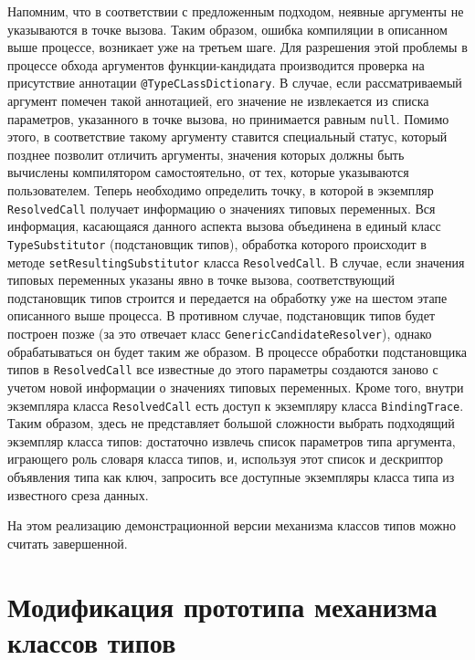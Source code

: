 Напомним, что в соответствии с предложенным подходом, неявные аргументы не указываются в точке вызова. Таким образом, ошибка компиляции в описанном выше процессе, возникает уже на третьем шаге. Для разрешения этой проблемы в процессе обхода аргументов функции-кандидата производится проверка на присутствие аннотации \lstinline{@TypeCLassDictionary}. В случае, если рассматриваемый аргумент помечен такой аннотацией, его значение не извлекается из списка параметров, указанного в точке вызова, но принимается равным \lstinline{null}. Помимо этого, в соответствие такому аргументу ставится специальный статус, который позднее позволит отличить аргументы, значения которых должны быть вычислены компилятором самостоятельно, от тех, которые указываются пользователем. Теперь необходимо определить точку, в которой в экземпляр \lstinline{ResolvedCall} получает информацию о значениях типовых переменных. Вся информация, касающаяся данного аспекта вызова объединена в единый класс \lstinline{TypeSubstitutor} (подстановщик типов), обработка которого происходит в методе \lstinline{setResultingSubstitutor} класса \lstinline{ResolvedCall}. В случае, если значения типовых переменных указаны явно в точке вызова, соответствующий подстановщик типов строится и передается на обработку уже на шестом этапе описанного выше процесса. В противном случае, подстановщик типов будет построен позже (за это отвечает класс \lstinline{GenericCandidateResolver}), однако обрабатываться он будет таким же образом. В процессе обработки подстановщика типов в \lstinline{ResolvedCall} все известные до этого параметры создаются заново с учетом новой информации о значениях типовых переменных. Кроме того, внутри экземпляра класса \lstinline{ResolvedCall} есть доступ к экземпляру класса \lstinline{BindingTrace}. Таким образом, здесь не представляет большой сложности выбрать подходящий экземпляр класса типов: достаточно извлечь список параметров типа аргумента, играющего роль словаря класса типов, и, используя этот список и дескриптор объявления типа как ключ, запросить все доступные экземпляры класса типа из известного среза данных.    

На этом реализацию демонстрационной версии механизма классов типов можно считать завершенной. 

\section{Модификация прототипа механизма классов типов}

